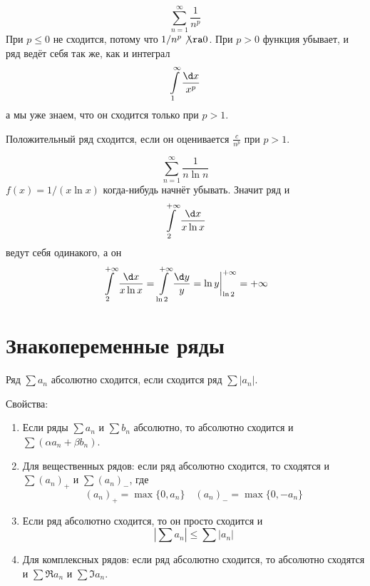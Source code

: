 \begin{exmp}
	\[ \sum_{n=1}^\infty \frac1{n^p} \]
	При $p \le 0$ не сходится, потому что $1/n^p \not\ra 0$.
	При $p > 0$ функция убывает, и ряд ведёт себя так же, как и интеграл
	\[ \int\limits_1^\infty \frac{\d x}{x^p} \]
	а мы уже знаем, что он сходится только при $p > 1$.
\end{exmp}

\begin{conseq}
	Положительный ряд сходится, если он оценивается $\frac{c}{n^p}$ при $p > 1$.
\end{conseq}

\begin{conseq}
	\[ \sum_{n=1}^\infty \frac{1}{n \ln n} \]
	$f(x) = 1/(x \ln x)$ когда-нибудь начнёт убывать.
	Значит ряд и
	\[ \int\limits_2^{+\infty} \frac{\d x}{x \ln x} \]
	ведут себя одинакого, а он
	\[ \int\limits_2^{+\infty} \frac{\d x}{x \ln x} = \int\limits_{\ln 2}^{+\infty} \frac{\d y}y = \ln y \biggr|_{\ln 2}^{+\infty} = +\infty \]
\end{conseq}

\section{Знакопеременные ряды}

\begin{Def}
	Ряд $\sum a_n$ абсолютно сходится, если сходится ряд $\sum |a_n|$.
\end{Def}

Свойства:
\begin{enumerate}
\item
	Если ряды $\sum a_n$ и $\sum b_n$ абсолютно, то абсолютно сходится и $\sum (\alpha a_n + \beta b_n)$.

\item
	Для вещественных рядов: если ряд абсолютно сходится, то сходятся и $\sum (a_n)_+$ и $\sum (a_n)_-$, где
	\[ (a_n)_+ = \max \{0, a_n\} \quad (a_n)_- = \max \{0, -a_n\} \]

\item
	Если ряд абсолютно сходится, то он просто сходится и
	\[ \left| \sum a_n \right| \le \sum |a_n| \]

\item
	Для комплексных рядов: если ряд абсолютно сходится, то абсолютно сходятся и $\sum \Re a_n$ и $\sum \Im a_n$.
\end{enumerate}

